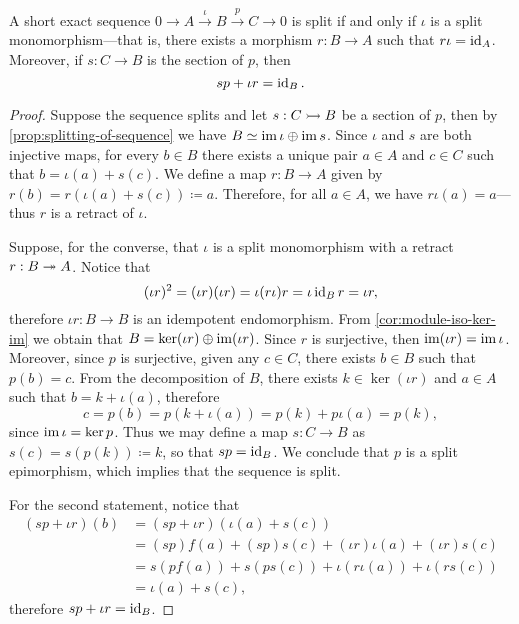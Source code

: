 \begin{proposition}
    \label{prop:split-short-exact-sequence}
    A short exact sequence \(0 \to A \xrightarrow \iota B \xrightarrow p C \to 0\)
    is split if and only if \(\iota\) is a split monomorphism---that is, there
    exists a morphism \(r: B \to A\) such that \(r \iota = \operatorname{id}_A\). Moreover, if
    \(s: C \to B\) is the section of \(p\), then
    \[
        s p + \iota r = \operatorname{id}_B.
    \]
\end{proposition}

\begin{proof}
    Suppose the sequence splits and let \(s: C \rightarrowtail B\) be a section of \(p\), then
    by \cref{prop:splitting-of-sequence} we have \(B \simeq \operatorname{im} \iota \oplus \operatorname{im}
    s\). Since \(\iota\) and \(s\) are both injective maps, for every \(b \in B\)
    there exists a unique pair \(a \in A\) and \(c \in C\) such that
    \(b = \iota(a) + s(c)\). We define a map \(r: B \to A\) given by
    \(r(b) = r(\iota(a) + s(c)) \coloneq a\). Therefore, for all \(a \in A\), we
    have \(r \iota(a) = a\)---thus \(r\) is a retract of \(\iota\).

    Suppose, for the converse, that \(\iota\) is a split monomorphism with a retract
    \(r: B \twoheadrightarrow A\). Notice that
    \[
        (\iota r)^2 = (\iota r) (\iota r) = \iota (r \iota) r = \iota \operatorname{id}_B r
        = \iota r,
    \]
    therefore \(\iota r: B \to B\) is an idempotent endomorphism. From
    \cref{cor:module-iso-ker-im} we obtain that \(B = \ker(\iota r) \oplus \operatorname{im}(\iota
    r)\). Since \(r\) is surjective, then \(\operatorname{im}(\iota r) = \operatorname{im} \iota\). Moreover,
    since \(p\) is surjective, given any \(c \in C\), there exists \(b \in B\) such
    that \(p(b) = c\). From the decomposition of \(B\), there exists \(k \in
    \ker(\iota r)\) and \(a \in A\) such that \(b = k + \iota(a)\), therefore
    \[
        c = p(b) = p(k + \iota(a)) = p(k) + p \iota(a) = p(k),
    \]
    since \(\operatorname{im} \iota = \ker p\). Thus we may define a map \(s: C \to B\) as
    \(s(c) = s(p(k)) \coloneq k\), so that \(s p = \operatorname{id}_B\). We conclude that \(p\)
    is a split epimorphism, which implies that the sequence is split.

    For the second statement, notice that
    \begin{align*}
        (s p + \iota r)(b)
         & = (s p + \iota r)(\iota(a) + s(c))                              \\
         & = (s p) f(a) + (s p) s(c) + (\iota r) \iota(a) + (\iota r) s(c) \\
         & = s (p f(a)) + s (p s(c)) + \iota (r \iota(a)) + \iota (r s(c)) \\
         & = \iota(a) + s(c),
    \end{align*}
    therefore \(s p + \iota r = \operatorname{id}_B\).
\end{proof}

